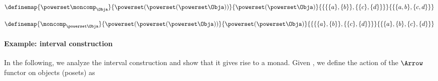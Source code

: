 {\begin{forslides}
\begin{equation}
    \label{eq:monad-power-power-moncomp}
    \definemap{
        \powerset \moncomp_{\Obja}
    }{
        \powerset (\powerset (\powerset\Obja))
    }{
        \powerset (\powerset \Obja)
    }{
        \{  \{   \{a\}, \{b\} \} , \{ \{c\}, \{d\} \}\}
    }{
        \{  \{ a, b \}, \{ c, d \} \}
    }
\end{equation}

\begin{equation}
    \label{eq:monad-power-moncomp-power}
    \definemap{
        \moncomp_{\powerset \Obja}
    }{
        \powerset (\powerset (\powerset\Obja))
    }{
        \powerset (\powerset \Obja)
    }{
        \{  \{   \{a\}, \{b\} \} , \{ \{c\}, \{d\} \}\}
    }{
        \{    \{a\}, \{b\}  ,  \{c\}, \{d\}  \}
    }
\end{equation}
%
\end{forslides}
}


\paragraph*{Example: interval construction}
In the following, we analyze the interval construction and show that it gives rise to a monad.
Given \Pos, we define the action of the $\Arrow$ functor on objects (posets) as


